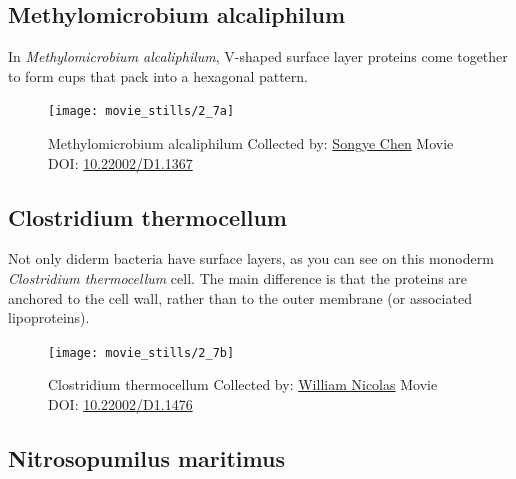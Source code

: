 \documentclass[]{tufte-book}
\begin{document}
\hypertarget{Methylomicrobium_alcaliphilum}{\subsection{Methylomicrobium
alcaliphilum}\label{Methylomicrobium_alcaliphilum}}

In \emph{Methylomicrobium alcaliphilum}, V-shaped surface layer proteins
come together to form cups that pack into a hexagonal pattern.





\begin{figure}
\texttt{[image: movie\_stills/2\_7a]} \caption[Methylomicrobium alcaliphilum Collected by:
\protect\hyperlink{songye_chen}{Songye Chen} Movie DOI:
\href{https://doi.org/10.22002/D1.1367}{10.22002/D1.1367}]{Methylomicrobium alcaliphilum Collected by:
\protect\hyperlink{songye_chen}{Songye Chen} Movie DOI:
\href{https://doi.org/10.22002/D1.1367}{10.22002/D1.1367}}\label{fig:2-7a}
\end{figure}

\hypertarget{Clostridium_thermocellum}{\subsection{Clostridium
thermocellum}\label{Clostridium_thermocellum}}

Not only diderm bacteria have surface layers, as you can see on this
monoderm \emph{Clostridium thermocellum} cell. The main difference is
that the proteins are anchored to the cell wall, rather than to the
outer membrane (or associated lipoproteins).





\begin{figure}
\texttt{[image: movie\_stills/2\_7b]} \caption[Clostridium thermocellum Collected by:
\protect\hyperlink{william_nicolas}{William Nicolas} Movie DOI:
\href{https://doi.org/10.22002/D1.1476}{10.22002/D1.1476}]{Clostridium thermocellum Collected by:
\protect\hyperlink{william_nicolas}{William Nicolas} Movie DOI:
\href{https://doi.org/10.22002/D1.1476}{10.22002/D1.1476}}\label{fig:2-7b}
\end{figure}

\hypertarget{Nitrosopumilus_maritimus}{\subsection{Nitrosopumilus
maritimus}\label{Nitrosopumilus_maritimus}}
\end{document}
